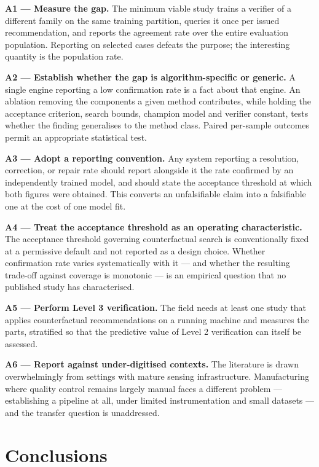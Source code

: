 \documentclass[11pt,a4paper]{article}
\begin{document}
\textbf{A1 --- Measure the gap.} The minimum viable study trains a verifier of a different family on the same training partition, queries it once per issued recommendation, and reports the agreement rate over the entire evaluation population. Reporting on selected cases defeats the purpose; the interesting quantity is the population rate.

\textbf{A2 --- Establish whether the gap is algorithm-specific or generic.} A single engine reporting a low confirmation rate is a fact about that engine. An ablation removing the components a given method contributes, while holding the acceptance criterion, search bounds, champion model and verifier constant, tests whether the finding generalises to the method class. Paired per-sample outcomes permit an appropriate statistical test.

\textbf{A3 --- Adopt a reporting convention.} Any system reporting a resolution, correction, or repair rate should report alongside it the rate confirmed by an independently trained model, and should state the acceptance threshold at which both figures were obtained. This converts an unfalsifiable claim into a falsifiable one at the cost of one model fit.

\textbf{A4 --- Treat the acceptance threshold as an operating characteristic.} The acceptance threshold governing counterfactual search is conventionally fixed at a permissive default and not reported as a design choice. Whether confirmation rate varies systematically with it --- and whether the resulting trade-off against coverage is monotonic --- is an empirical question that no published study has characterised.

\textbf{A5 --- Perform Level 3 verification.} The field needs at least one study that applies counterfactual recommendations on a running machine and measures the parts, stratified so that the predictive value of Level 2 verification can itself be assessed.

\textbf{A6 --- Report against under-digitised contexts.} The literature is drawn overwhelmingly from settings with mature sensing infrastructure. Manufacturing where quality control remains largely manual faces a different problem --- establishing a pipeline at all, under limited instrumentation and small datasets --- and the transfer question is unaddressed.

\section{Conclusions}
\end{document}
